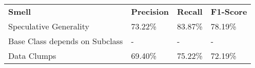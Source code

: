 \begin{tabularx}{\linewidth}{XXXX}
\toprule
\textbf{Smell} & \textbf{Precision} & \textbf{Recall} & \textbf{F1-Score} \\
\cmidrule{1-1}\cmidrule{2-2}\cmidrule{3-3}\cmidrule{4-4}
Speculative Generality & 73.22\% & 83.87\% & 78.19\% \\
\cmidrule{1-1}\cmidrule{2-2}\cmidrule{3-3}\cmidrule{4-4}
Base Class depends on Subclass & - & - & - \\
\cmidrule{1-1}\cmidrule{2-2}\cmidrule{3-3}\cmidrule{4-4}
Data Clumps & 69.40\% & 75.22\% & 72.19\% \\
\bottomrule
\end{tabularx}

